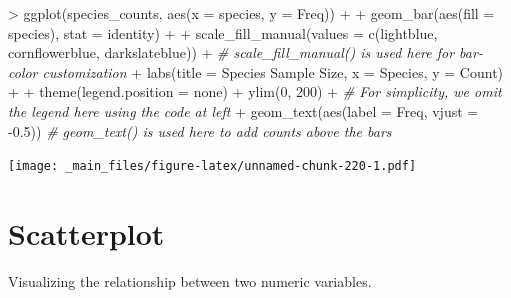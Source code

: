 \documentclass[
]{book}
\newenvironment{Shaded}{\begin{snugshade}}{\end{snugshade}}
\newcommand{\AttributeTok}[1]{\textcolor[rgb]{0.77,0.63,0.00}{#1}}
\newcommand{\CommentTok}[1]{\textcolor[rgb]{0.56,0.35,0.01}{\textit{#1}}}
\newcommand{\DecValTok}[1]{\textcolor[rgb]{0.00,0.00,0.81}{#1}}
\newcommand{\FloatTok}[1]{\textcolor[rgb]{0.00,0.00,0.81}{#1}}
\newcommand{\FunctionTok}[1]{\textcolor[rgb]{0.00,0.00,0.00}{#1}}
\newcommand{\NormalTok}[1]{#1}
\newcommand{\SpecialCharTok}[1]{\textcolor[rgb]{0.00,0.00,0.00}{#1}}
\newcommand{\StringTok}[1]{\textcolor[rgb]{0.31,0.60,0.02}{#1}}
\begin{document}
\begin{Shaded}
\begin{Highlighting}[]
\SpecialCharTok{\textgreater{}} \FunctionTok{ggplot}\NormalTok{(species\_counts, }\FunctionTok{aes}\NormalTok{(}\AttributeTok{x =}\NormalTok{ species, }\AttributeTok{y =}\NormalTok{ Freq)) }\SpecialCharTok{+}
\SpecialCharTok{+}   \FunctionTok{geom\_bar}\NormalTok{(}\FunctionTok{aes}\NormalTok{(}\AttributeTok{fill =}\NormalTok{ species), }\AttributeTok{stat =} \StringTok{\textquotesingle{}identity\textquotesingle{}}\NormalTok{) }\SpecialCharTok{+}
\SpecialCharTok{+}   \FunctionTok{scale\_fill\_manual}\NormalTok{(}\AttributeTok{values =} \FunctionTok{c}\NormalTok{(}\StringTok{\textquotesingle{}lightblue\textquotesingle{}}\NormalTok{, }\StringTok{\textquotesingle{}cornflowerblue\textquotesingle{}}\NormalTok{, }\StringTok{\textquotesingle{}darkslateblue\textquotesingle{}}\NormalTok{)) }\SpecialCharTok{+} \CommentTok{\# scale\_fill\_manual() is used here for bar{-}color customization}
\SpecialCharTok{+}   \FunctionTok{labs}\NormalTok{(}\AttributeTok{title =} \StringTok{\textquotesingle{}Species Sample Size\textquotesingle{}}\NormalTok{, }\AttributeTok{x =} \StringTok{\textquotesingle{}Species\textquotesingle{}}\NormalTok{, }\AttributeTok{y =} \StringTok{\textquotesingle{}Count\textquotesingle{}}\NormalTok{) }\SpecialCharTok{+}
\SpecialCharTok{+}   \FunctionTok{theme}\NormalTok{(}\AttributeTok{legend.position =} \StringTok{\textquotesingle{}none\textquotesingle{}}\NormalTok{) }\SpecialCharTok{+} \FunctionTok{ylim}\NormalTok{(}\DecValTok{0}\NormalTok{, }\DecValTok{200}\NormalTok{) }\SpecialCharTok{+} \CommentTok{\# For simplicity, we omit the legend here using the code at left}
\SpecialCharTok{+}   \FunctionTok{geom\_text}\NormalTok{(}\FunctionTok{aes}\NormalTok{(}\AttributeTok{label =}\NormalTok{ Freq, }\AttributeTok{vjust =} \SpecialCharTok{{-}}\FloatTok{0.5}\NormalTok{)) }\CommentTok{\# geom\_text() is used here to add counts above the bars}
\end{Highlighting}
\end{Shaded}

\texttt{[image: \_main\_files/figure-latex/unnamed-chunk-220-1.pdf]}

\hypertarget{scatterplot}{%
\section{Scatterplot}\label{scatterplot}}

Visualizing the relationship between two numeric variables.
\end{document}
